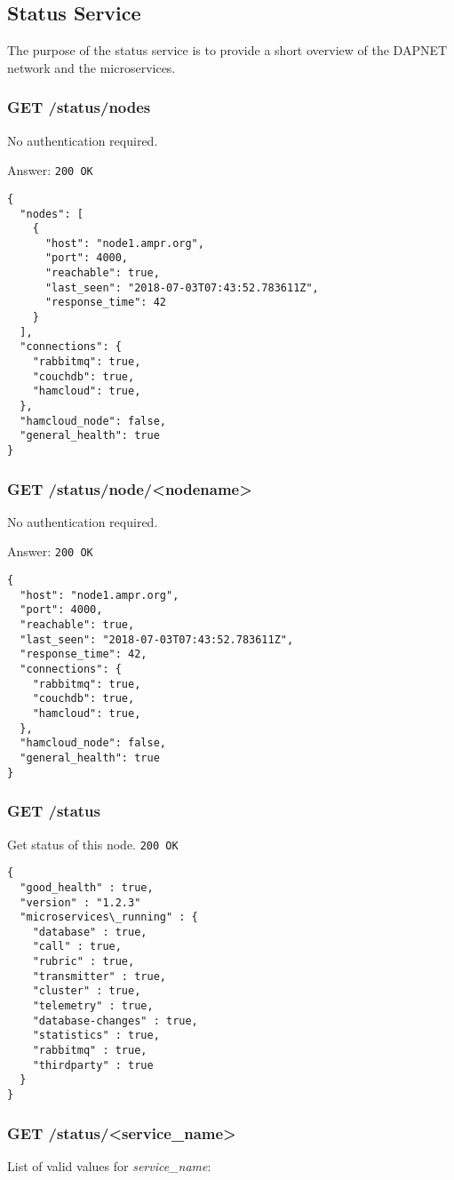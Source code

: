 \subsection{Status Service}
The purpose of the status service is to provide a short overview of the DAPNET network and the microservices.

\subsubsection{GET /status/nodes}
No authentication required.

Answer:
\texttt{200 OK}
\begin{lstlisting}
{
  "nodes": [
    {
      "host": "node1.ampr.org",
      "port": 4000,
      "reachable": true,
      "last_seen": "2018-07-03T07:43:52.783611Z",
      "response_time": 42
    }
  ],
  "connections": {
    "rabbitmq": true,
    "couchdb": true,
    "hamcloud": true,
  },
  "hamcloud_node": false,
  "general_health": true
}
\end{lstlisting}

\subsubsection{GET /status/node/<nodename>}
No authentication required.

Answer:
\texttt{200 OK}
\begin{lstlisting}
{
  "host": "node1.ampr.org",
  "port": 4000,
  "reachable": true,
  "last_seen": "2018-07-03T07:43:52.783611Z",
  "response_time": 42,
  "connections": {
    "rabbitmq": true,
    "couchdb": true,
    "hamcloud": true,
  },
  "hamcloud_node": false,
  "general_health": true
}
\end{lstlisting}


\subsubsection{GET /status}
Get status of this node.
\texttt{200 OK}
\begin{lstlisting}
{
  "good_health" : true,
  "version" : "1.2.3"
  "microservices\_running" : {
    "database" : true,
    "call" : true,
    "rubric" : true,
    "transmitter" : true,
    "cluster" : true,
    "telemetry" : true,
    "database-changes" : true,
    "statistics" : true,
    "rabbitmq" : true,
    "thirdparty" : true
  }
}
\end{lstlisting}

\subsubsection{GET /status/<service\_name>}
List of valid values for \textit{service\_name}:

